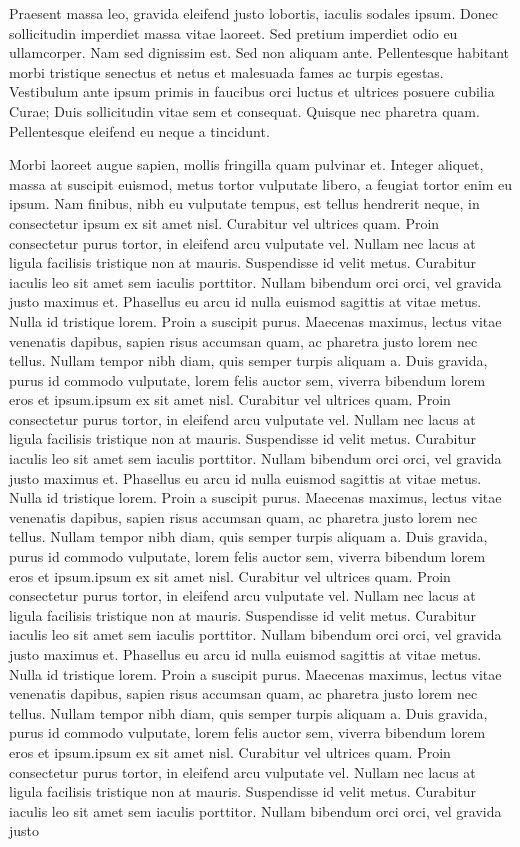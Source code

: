 \documentclass{article}
\begin{document}
  Praesent massa leo, gravida eleifend justo lobortis, iaculis sodales ipsum. Donec sollicitudin imperdiet massa vitae laoreet. Sed pretium imperdiet odio eu ullamcorper. Nam sed dignissim est. Sed non aliquam ante. Pellentesque habitant morbi tristique senectus et netus et malesuada fames ac turpis egestas. Vestibulum ante ipsum primis in faucibus orci luctus et ultrices posuere cubilia Curae; Duis sollicitudin vitae sem et consequat. Quisque nec pharetra quam. Pellentesque eleifend eu neque a tincidunt.\stopmsdata


  Morbi laoreet augue sapien, mollis fringilla quam pulvinar et. Integer aliquet, massa at suscipit euismod, metus tortor vulputate libero, a feugiat tortor enim eu ipsum. Nam finibus, nibh eu vulputate tempus, est tellus hendrerit neque, in consectetur ipsum ex sit amet nisl. Curabitur vel ultrices quam. Proin consectetur purus tortor, in eleifend arcu vulputate vel. Nullam nec lacus at ligula facilisis tristique non at mauris. Suspendisse id velit metus. Curabitur iaculis leo sit amet sem iaculis porttitor. Nullam bibendum orci orci, vel gravida justo maximus et. Phasellus eu arcu id nulla euismod sagittis at vitae metus. Nulla id tristique lorem. Proin a suscipit purus. Maecenas maximus, lectus vitae venenatis dapibus, sapien risus accumsan quam, ac pharetra justo lorem nec tellus. Nullam tempor nibh diam, quis semper turpis aliquam a. Duis gravida, purus id commodo vulputate, lorem felis auctor sem, viverra bibendum lorem eros et ipsum.ipsum ex sit amet nisl. Curabitur vel ultrices quam. Proin consectetur purus tortor, in eleifend arcu vulputate vel. Nullam nec lacus at ligula facilisis tristique non at mauris. Suspendisse id velit metus. Curabitur iaculis leo sit amet sem iaculis porttitor. Nullam bibendum orci orci, vel gravida justo maximus et. Phasellus eu arcu id nulla euismod sagittis at vitae metus. Nulla id tristique lorem. Proin a suscipit purus. Maecenas maximus, lectus vitae venenatis dapibus, sapien risus accumsan quam, ac pharetra justo lorem nec tellus. Nullam tempor nibh diam, quis semper turpis aliquam a. Duis gravida, purus id commodo vulputate, lorem felis auctor sem, viverra bibendum lorem eros et ipsum.ipsum ex sit amet nisl. Curabitur vel ultrices quam. Proin consectetur purus tortor, in eleifend arcu vulputate vel. Nullam nec lacus at ligula facilisis tristique non at mauris. Suspendisse id velit metus. Curabitur iaculis leo sit amet sem iaculis porttitor. Nullam bibendum orci orci, vel gravida justo maximus et. Phasellus eu arcu id nulla euismod sagittis at vitae metus. Nulla id tristique lorem. Proin a suscipit purus. Maecenas maximus, lectus vitae venenatis dapibus, sapien risus accumsan quam, ac pharetra justo lorem nec tellus. Nullam tempor nibh diam, quis semper turpis aliquam a. Duis gravida, purus id commodo vulputate, lorem felis auctor sem, viverra bibendum lorem eros et ipsum.ipsum ex sit amet nisl. Curabitur vel ultrices quam. Proin consectetur purus tortor, in eleifend arcu vulputate vel. Nullam nec lacus at ligula facilisis tristique non at mauris. Suspendisse id velit metus. Curabitur iaculis leo sit amet sem iaculis porttitor. Nullam bibendum orci orci, vel gravida justo 
\end{document}
